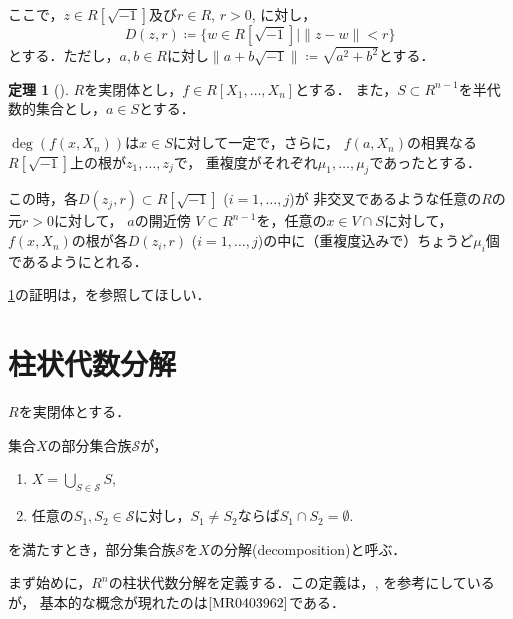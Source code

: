 \documentclass[uplatex, dvipdfmx]{jsarticle}
\numberwithin{equation}{section}
\newcommand{\norm}[1]{\| {#1} \|}
\theoremstyle{definition}
\newtheorem{theorem}[definition]{定理}
\begin{document}
ここで，$z \in R\left[ \sqrt{-1} \right]$及び$r \in R$, $r>0$, に対し，
\begin{equation}
     D(z, r)\coloneqq \{w \in R\left[\sqrt{-1}\right] \mid \norm{z - w} < r\}
\end{equation}
とする．ただし，$a,b \in R$に対し$\norm{a + b\sqrt{-1}} \coloneqq \sqrt{a^2 + b^2}$とする．

\begin{theorem}[{\cite[Theorem 5.12]{MR2248869}}] \label{theorem:continuity-of-roots}
     $R$を実閉体とし，$f \in R[X_1, \dots, X_n]$とする．
     また，$S \subset R^{n-1}$を半代数的集合とし，$a \in S$とする．

     $\deg (f(x,X_n))$は$x \in S$に対して一定で，さらに，
     $f(a,X_n)$の相異なる$R\left[\sqrt{-1} \right]$上の根が$z_1, \dots, z_j$で，
     重複度がそれぞれ$\mu_1, \dots, \mu_j$であったとする．

     この時，各$D(z_j, r) \subset R\left[ \sqrt{-1} \right]$ ($i=1, \dots, j$)が
     非交叉であるような任意の$R$の元$r > 0$に対して，
     $a$の開近傍 $V \subset R^{n-1}$を，任意の$x \in V \cap S$に対して，
     $f(x, X_n)$の根が各$D(z_i, r)$ ($i=1, \dots, j$)の中に（重複度込みで）ちょうど$\mu_i$個であるようにとれる．
\end{theorem}

\cref{theorem:continuity-of-roots}の証明は，\cite[Theorem 5.12]{MR2248869}を参照してほしい．


\section{柱状代数分解}

$R$を実閉体とする．

集合$X$の部分集合族$\mathcal{S}$が，
\begin{enumerate}
     \item $X = \bigcup_{S \in \mathcal{S}} S$,
     \item 任意の$S_1, S_2 \in \mathcal{S}$に対し，$S_1 \neq S_2$ならば$S_1 \cap S_2 = \emptyset$.
\end{enumerate}
を満たすとき，部分集合族$\mathcal{S}$を$X$の分解(decomposition)と呼ぶ．

まず始めに，$R^n$の柱状代数分解を定義する．この定義は，\cite{MR0764184}, \cite[Definition 5.1]{MR2248869}を参考にしているが，
基本的な概念が現れたのは$\cite{MR0403962}$である．
\end{document}
